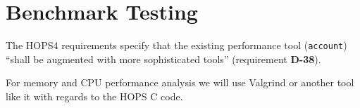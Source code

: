 %
%
\section{Benchmark Testing}
\label{sec:benchmark}

The HOPS4 requirements specify that the existing performance tool (\texttt{account}) ``shall be augmented with more sophisticated tools'' (requirement \textbf{D-38}).

For memory and CPU performance analysis we will use Valgrind or another tool like it with regards to the HOPS C code.


%
%

